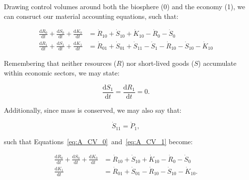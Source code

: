 Drawing control volumes around both the biosphere (0) and the economy (1), we can consruct
our material accounting equations, such that:

\begin{align}
\label{eq:A_CV_0}
	\frac{\mathrm{d}R_0}{\mathrm{d}t}		
	+	\frac{\mathrm{d}S_0}{\mathrm{d}t}
	+	\frac{\mathrm{d}K_0}{\mathrm{d}t}		&	
	=	\dot{R}_{10}		
	+	\dot{S}_{10}	
	+	\dot{K}_{10}											
	-	\dot{R}_{0}											
	-	\dot{S}_{0}								\\
\label{eq:A_CV_1}
	\frac{\mathrm{d}R_{1}}{\mathrm{d}t}
	+ \frac{\mathrm{d}S_{1}}{\mathrm{d}t}
	+ \frac{\mathrm{d}K_{1}}{\mathrm{d}t}		&
	= \dot{R}_{01} 
	+ \dot{S}_{01} + \dot{S}_{11}
	- \dot{S}_{1}				
	- \dot{R}_{10}				
	- \dot{S}_{10}				
	- \dot{K}_{10}											
\end{align}

\noindent{}Remembering that neither resources ($R$) 
nor short-lived goods ($S$) accumulate within economic sectors, we may state:

\begin{equation}\label{eq:A-dS_1/dt_zero}
	\frac{\mathrm{d}S_1}{\mathrm{d}t}
	= \frac{\mathrm{d}R_1}{\mathrm{d}t}
	= 0.
\end{equation}

\noindent{}Additionally, since mass is conserved, we may also say that:

\begin{equation}\label{eq:A_S11}
	\dot{S}_{11} = \dot{P}_{1},
\end{equation}

\noindent{}such that Equations~\ref{eq:A_CV_0}~and~\ref{eq:A_CV_1} 
become:


\begin{align}\label{eq:A_CV_0b}
	\frac{\mathrm{d}R_0}{\mathrm{d}t}		
	+	\frac{\mathrm{d}S_0}{\mathrm{d}t}
	+	\frac{\mathrm{d}K_0}{\mathrm{d}t}		&	
	=	\dot{R}_{10}		
	+	\dot{S}_{10}	
	+	\dot{K}_{10}											
	-	\dot{R}_{0}											
	-	\dot{S}_{0}								\\
	\label{eq:A_CV_1b}
	\frac{\mathrm{d}K_{1}}{\mathrm{d}t}		&
	= \dot{R}_{01} 
	+ \dot{S}_{01} 
	- \dot{R}_{10}				
	- \dot{S}_{10}				
	- \dot{K}_{10}.										
\end{align}

